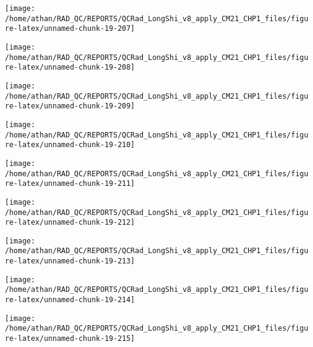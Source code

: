 \documentclass[
  10pt,
  a4paper,oneside]{article}
\begin{document}
\begin{center}\texttt{[image: /home/athan/RAD\_QC/REPORTS/QCRad\_LongShi\_v8\_apply\_CM21\_CHP1\_files/figure-latex/unnamed-chunk-19-207]} \end{center}

\begin{center}\texttt{[image: /home/athan/RAD\_QC/REPORTS/QCRad\_LongShi\_v8\_apply\_CM21\_CHP1\_files/figure-latex/unnamed-chunk-19-208]} \end{center}

\begin{center}\texttt{[image: /home/athan/RAD\_QC/REPORTS/QCRad\_LongShi\_v8\_apply\_CM21\_CHP1\_files/figure-latex/unnamed-chunk-19-209]} \end{center}

\begin{center}\texttt{[image: /home/athan/RAD\_QC/REPORTS/QCRad\_LongShi\_v8\_apply\_CM21\_CHP1\_files/figure-latex/unnamed-chunk-19-210]} \end{center}

\begin{center}\texttt{[image: /home/athan/RAD\_QC/REPORTS/QCRad\_LongShi\_v8\_apply\_CM21\_CHP1\_files/figure-latex/unnamed-chunk-19-211]} \end{center}

\begin{center}\texttt{[image: /home/athan/RAD\_QC/REPORTS/QCRad\_LongShi\_v8\_apply\_CM21\_CHP1\_files/figure-latex/unnamed-chunk-19-212]} \end{center}

\begin{center}\texttt{[image: /home/athan/RAD\_QC/REPORTS/QCRad\_LongShi\_v8\_apply\_CM21\_CHP1\_files/figure-latex/unnamed-chunk-19-213]} \end{center}

\begin{center}\texttt{[image: /home/athan/RAD\_QC/REPORTS/QCRad\_LongShi\_v8\_apply\_CM21\_CHP1\_files/figure-latex/unnamed-chunk-19-214]} \end{center}

\begin{center}\texttt{[image: /home/athan/RAD\_QC/REPORTS/QCRad\_LongShi\_v8\_apply\_CM21\_CHP1\_files/figure-latex/unnamed-chunk-19-215]} \end{center}
\end{document}
